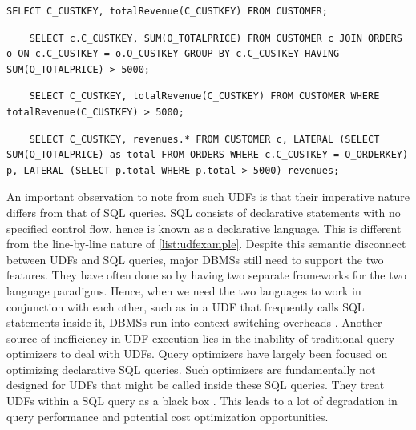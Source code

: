 \documentclass[12pt]{cmuthesis}
\begin{document}
\begin{listing}
    \begin{verbatim}
SELECT C_CUSTKEY, totalRevenue(C_CUSTKEY) FROM CUSTOMER;
    \end{verbatim}
    \caption{Invocation of \cref{list:udfexample}}
        \label{list:udfexampleinvocation}
\end{listing}

\newpage
\begin{verbatim}
    SELECT c.C_CUSTKEY, SUM(O_TOTALPRICE) FROM CUSTOMER c JOIN ORDERS o ON c.C_CUSTKEY = o.O_CUSTKEY GROUP BY c.C_CUSTKEY HAVING SUM(O_TOTALPRICE) > 5000;
\end{verbatim}


\begin{verbatim}
    SELECT C_CUSTKEY, totalRevenue(C_CUSTKEY) FROM CUSTOMER WHERE totalRevenue(C_CUSTKEY) > 5000;
\end{verbatim}

\begin{verbatim}
    SELECT C_CUSTKEY, revenues.* FROM CUSTOMER c, LATERAL (SELECT SUM(O_TOTALPRICE) as total FROM ORDERS WHERE c.C_CUSTKEY = O_ORDERKEY) p, LATERAL (SELECT p.total WHERE p.total > 5000) revenues;
\end{verbatim}

An important observation to note from such UDFs is that their imperative nature differs from that of SQL queries. SQL consists of declarative statements with no specified control flow, hence is known as a declarative language. This is different from the line-by-line nature of \cref{list:udfexample}. Despite this semantic disconnect between UDFs and SQL queries, major DBMSs still need to support the two features. They have often done so by having two separate frameworks for the two language paradigms. Hence, when we need the two languages to work in conjunction with each other, such as in a UDF that frequently calls SQL statements inside it, DBMSs run into context switching overheads \cite{duta19,ramachandra19}. Another source of inefficiency in UDF execution lies in the inability of traditional query optimizers to deal with UDFs. Query optimizers have largely been focused on optimizing declarative SQL queries. Such optimizers are fundamentally not designed for UDFs that might be called inside these SQL queries. They treat UDFs within a SQL query as a black box \cite{ramachandra2019blackmagic}. This leads to a lot of degradation in query performance and potential cost optimization opportunities.
\end{document}
